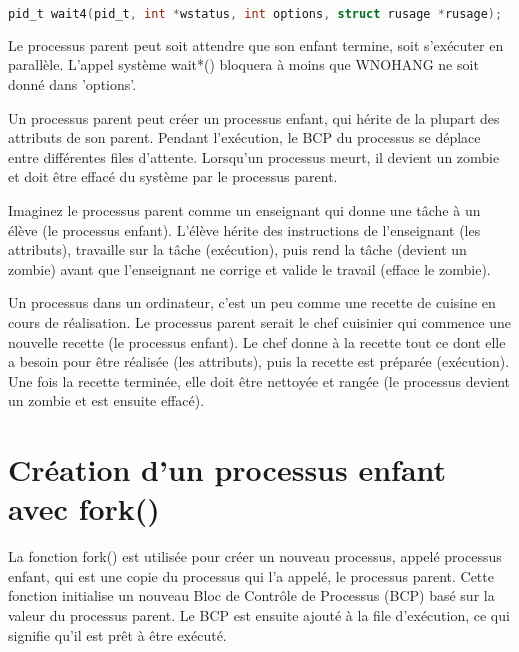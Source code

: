 \documentclass[12pt]{report}
\begin{document}
\begin{lstlisting}[language=C]
pid_t wait4(pid_t, int *wstatus, int options, struct rusage *rusage);
\end{lstlisting}

Le processus parent peut soit attendre que son enfant termine, soit s'exécuter en parallèle. L'appel système wait*() bloquera à moins que WNOHANG ne soit donné dans 'options'.
\begin{tcolorbox}[colback=yellow!5, colframe=yellow!80!black, title={\faBookmark À retenir}]
Un processus parent peut créer un processus enfant, qui hérite de la plupart des attributs de son parent. Pendant l'exécution, le BCP du processus se déplace entre différentes files d'attente. Lorsqu'un processus meurt, il devient un zombie et doit être effacé du système par le processus parent.
\end{tcolorbox}
\begin{tcolorbox}[colback=green!5, colframe=green!75!black, title={\faLightbulb Intuition}]
Imaginez le processus parent comme un enseignant qui donne une tâche à un élève (le processus enfant). L'élève hérite des instructions de l'enseignant (les attributs), travaille sur la tâche (exécution), puis rend la tâche (devient un zombie) avant que l'enseignant ne corrige et valide le travail (efface le zombie).
\end{tcolorbox}
\begin{tcolorbox}[colback=blue!5, colframe=blue!75!black, title={\faLightbulb Vulgarisation simple}]
Un processus dans un ordinateur, c'est un peu comme une recette de cuisine en cours de réalisation. Le processus parent serait le chef cuisinier qui commence une nouvelle recette (le processus enfant). Le chef donne à la recette tout ce dont elle a besoin pour être réalisée (les attributs), puis la recette est préparée (exécution). Une fois la recette terminée, elle doit être nettoyée et rangée (le processus devient un zombie et est ensuite effacé).
\end{tcolorbox}

\section{Création d'un processus enfant avec fork()} 

La fonction fork() est utilisée pour créer un nouveau processus, appelé processus enfant, qui est une copie du processus qui l'a appelé, le processus parent. Cette fonction initialise un nouveau Bloc de Contrôle de Processus (BCP) basé sur la valeur du processus parent. Le BCP est ensuite ajouté à la file d'exécution, ce qui signifie qu'il est prêt à être exécuté. 
\end{document}
